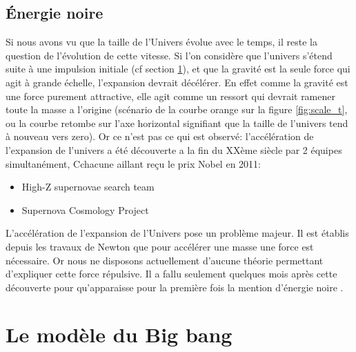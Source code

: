 
\subsection{Énergie noire}
\label{sec:dark_egy}


Si nous avons vu que la taille de l'Univers évolue avec le temps, il reste la question de l’évolution de cette vitesse.
Si l'on considère que l'univers s'étend suite à une impulsion initiale (cf section \ref{sec:BB}), et que la gravité est la seule force qui agit à grande échelle, l'expansion devrait décélérer.
En effet comme la gravité est une force purement attractive, elle agit comme un ressort qui devrait ramener toute la masse a l'origine (scénario de la courbe orange sur la figure \ref{fig:scale_t}, ou la courbe retombe sur l'axe horizontal signifiant que la taille de l'univers tend à nouveau vers zero).
Or ce n'est pas ce qui est observé: l'accélération de l'expansion de l'univers a été découverte a la fin du XXème siècle par 2 équipes simultanément, Cchacune aillant reçu le prix Nobel en 2011:
\begin{itemize}
\item  High-Z supernovae search team \citep{1998AJ....116.1009R} %
\item  Supernova Cosmology Project \citep{1999ApJ...517..565P} %
\end{itemize}

L'accélération de l'expansion de l'Univers pose un problème majeur.
Il est établis depuis les travaux de Newton que pour accélérer une masse une force est nécessaire.
Or nous ne disposons actuellement d'aucune théorie permettant d'expliquer cette force répulsive.
Il a fallu seulement quelques mois après cette découverte pour qu’apparaisse pour la première fois la mention d'énergie noire \citep{1999PhRvD..60h1301H}.


\section{Le modèle du Big bang}
\label{sec:BB}

